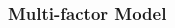 \documentclass[10pt, french]{article}
\begin{document}
\begin{multicols*}{2}
\subsubsection{Multi-factor Model}










\end{multicols*}

\end{document}
